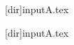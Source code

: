 \documentclass[10pt,a4paper]{article}
\begin{document}
\lazyrun{\macroA}[dir]{inputA.tex}

\lazyrun{\macroB}[dir]{inputA.tex}
\end{document}
